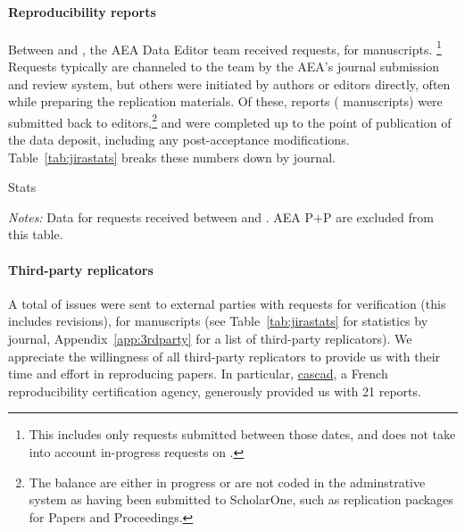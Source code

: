 \documentclass[PP]{AEA}
\begin{document}
\paragraph{Reproducibility reports}

Between \firstday{} and \lastday{}, the AEA Data Editor team  received
\jiraissues{} requests,  for \jiramcs{} manuscripts.%
%
\footnote{This includes only requests submitted between those dates, and does not take into account in-progress requests on \firstday{}.}
%
Requests typically are channeled to the team by the AEA's journal submission and review system, but others were initiated by authors or editors directly, often while preparing the replication materials. Of these,  \jiraissuescplt{} reports (\jiramcscplt{} manuscripts) were submitted back to editors,\footnote{The balance are either in progress or are not coded in the adminstrative system as having been submitted to ScholarOne, such as replication packages for Papers and Proceedings.} and \jiramcspending{} were completed up to the point of publication of the data deposit, including any post-acceptance modifications.  Table~\ref{tab:jirastats} breaks these numbers down by journal.
%

\begin{table}[]
    \caption{Stats}
    \label{tab:jirastats}
    \footnotesize
    \begin{threeparttable}
    \centering
    
    \begin{tablenotes}
    \item[] \textit{Notes:} Data for requests received between \firstday{} and \lastday{}. AEA P+P are excluded from this table.
    \end{tablenotes}
 \end{threeparttable}
   \end{table}


\paragraph{Third-party replicators}

A total of \jiraexternal{} issues were sent to external parties with requests for verification (this includes revisions), for \jiramcsexternal{} manuscripts (see Table~\ref{tab:jirastats} for statistics by journal, Appendix~\ref{app:3rdparty} for a list of third-party replicators). We appreciate the willingness of all third-party replicators to provide us with their time and effort in reproducing papers. In particular, \href{https://cascad.tech}{cascad}, a French reproducibility certification agency, generously provided us with 21 reports.
\end{document}
